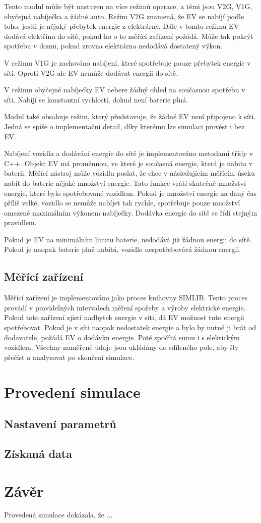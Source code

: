 \documentclass[12pt,a4paper]{article}
\begin{document}
Tento modul může být nastaven na více režimů operace, a těmi jsou V2G, V1G, obyčejná nabíječka a žádné auto.
Režim V2G znamená, že EV se nabíjí podle toho, jestli je nějaký přebytek energie z elektrárny.
Dále v tomto režimu EV dodává elektřinu do sítě, pokud ho o to měřící zařízení požádá.
Může tak pokrýt spotřebu v domu, pokud zrovna elektrárna nedodává dostatený výkon.

V režimu V1G je zachováno nabíjení, které spotřebuje pouze přebytek energie v síti.
Oproti V2G ale EV nemůže dodávat energii do sítě.

V režimu obyčejné nabíječky EV nebere žádný ohled na současnou spotřebu v síti.
Nabíjí se konstantní rychlostí, dokud není baterie plná.

Modul také obsahuje režim, který představuje, že žádné EV není připojeno k síti.
Jedná se spíše o implementační detail, díky kterému lze simulaci provést i bez EV.

Nabíjení vozidla a dodávání energie do sítě je implementováno metodami třídy v C++.
Objekt EV má proměnnou, ve které je současná energie, která je nabita v baterii.
Měřící nástroj může vozidlu poslat, že chce v následujícím měřícím úseku nabít do baterie nějaké množství energie.
Tato funkce vrátí skutečné množství energie, které bylo spotřebované vozidlem.
Pokud je množství energie za daný čas příliš velké,
vozidlo se nemůže nabíjet tak rychle, spotřebuje pouze množství omezené maximálním výkonem nabíječky.
Dodávka energie do sítě se řídí stejným pravidlem.

Pokud je EV na minimálním limitu baterie, nedodává již žádnou energii do sítě.
Pokud je naopak baterie plně nabitá, vozidlo nespotřebovává žádnou energii.

\subsection{Měřící zařízení}
Měřící zařízení je implementováno jako proces knihovny SIMLIB.
Tento proces provádí v pravidelných intervalech měření spořeby a výroby elektrické energie.
Pokud toto zařízení zjistí nadbytek energie v síti, dá EV možnost tuto energii spotřebovat.
Pokud je v síti naopak nedostatek energie a bylo by nutné ji brát od dodavatele, požádá EV o dodávku energie.
Poté spočítá sumu i s elekrickým vozidlem.
Všechny naměřené údaje jsou ukládány do sdíleného pole, aby šly přečíst a analyzovat po skončení simulace.

\section{Provedení simulace}

\subsection{Nastavení parametrů}

\subsection{Získaná data}


\section{Závěr}

Provedená simulace dokázala, že ...

\printbibliography
\end{document}
